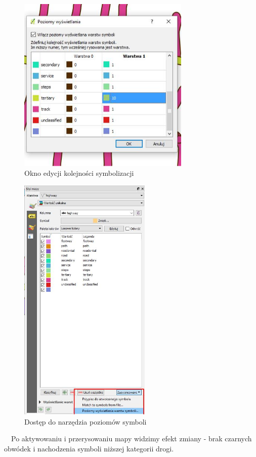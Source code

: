 \documentclass[12pt,a4paper]{book}
\begin{document}
\begin{center}
\begin{figure}
\includegraphics[width=8.202cm,height=8.456cm]{007-warstwy-symbolu.jpg}
\caption{Okno edycji kolejności symbolizacji}
\end{figure}
\end{center}
\begin{center}
\begin{figure}
\includegraphics[width=6.301cm,height=11.966cm]{007-warstwy-miejsce.jpg}
\caption{Dostęp do narzędzia poziomów symboli}
\end{figure}
\end{center}
\ \ Po aktywowaniu i przerysowaniu mapy widzimy efekt zmiany - brak czarnych obwódek i nachodzenia symboli niższej kategorii drogi.
\end{document}
